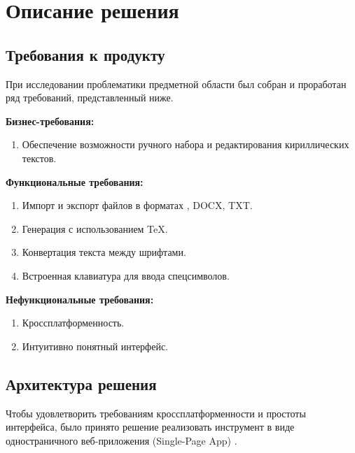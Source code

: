 
\section{Описание решения}
\subsection{Требования к продукту}
    \label{subsec:task1}

    При исследовании проблематики предметной области был собран и проработан ряд требований, представленный ниже.

    \vspace{1em}

    \textbf{Бизнес-требования:}
    \begin{enumerate}
        \item Обеспечение возможности ручного набора и редактирования кириллических текстов.
    \end{enumerate}

    \vspace{1em}

    \textbf{Функциональные требования:}
    \begin{enumerate}
        \item Импорт и экспорт файлов в форматах \pdf{}, DOCX, TXT.
        \item Генерация \pdf{} с использованием \TeX{}.
        \item Конвертация текста между шрифтами.
        \item Встроенная клавиатура для ввода спецсимволов.
    \end{enumerate}

    \vspace{1em}

    \textbf{Нефункциональные требования:}
    \begin{enumerate}
        \item Кроссплатформенность.
        \item Интуитивно понятный интерфейс.
    \end{enumerate}


\subsection{Архитектура решения}
    \label{subsec:task2}

    Чтобы удовлетворить требованиям кроссплатформенности и простоты интерфейса, было принято решение реализовать инструмент в виде одностраничного веб-приложения (Single-Page App) \cite{jadhav2015single}.

